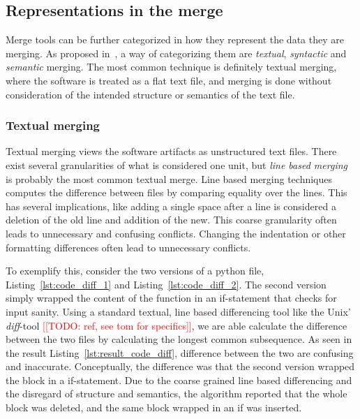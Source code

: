 \documentclass[a4paper,english]{ifimaster}
\newcommand{\todo}[1]{\textcolor{red}{[[TODO: #1]]}\PackageWarning{TODO:}{#1!}}
\begin{document}
\subsection{Representations in the merge}%
\label{sub:representations_in_the_merge}

Merge tools can be further categorized in how they represent the data they are merging. As proposed in~\cite{cite:tom_mens_software_merging_survey}, a way of categorizing them are \textit{textual}, \textit{syntactic} and \textit{semantic} merging. The most common technique is definitely textual merging, where the software is treated as a flat text file, and merging is done without consideration of the intended structure or semantics of the text file.

\subsubsection{Textual merging}%
\label{ssub:textual_merging}

Textual merging views the software artifacts as unstructured text files. There exist several granularities of what is considered one unit, but \textit{line based merging} is probably the most common textual merge. Line based merging techniques computes the difference between files by comparing equality over the lines. This has several implications, like adding a single space after a line is considered a deletion of the old line and addition of the new. This coarse granularity often leads to unnecessary and confusing conflicts. Changing the indentation or other formatting differences often lead to unnecessary conflicts.

To exemplify this, consider the two versions of a python file, Listing~\ref{lst:code_diff_1} and Listing~\ref{lst:code_diff_2}. The second version simply wrapped the content of the function in an if-statement that checks for input sanity. Using a standard textual, line based differencing tool like the Unix' \textit{diff}-tool \todo{ref, see tom for specifics}, we are able calculate the difference between the two files by calculating the longest common subsequence. As seen in the result Listing~\ref{lst:result_code_diff}, difference between the two are confusing and inaccurate. Conceptually, the difference was that the second version wrapped the block in a if-statement. Due to the coarse grained line based differencing and the disregard of structure and semantics, the algorithm reported that the whole block was deleted, and the same block wrapped in an if was inserted.
\end{document}

